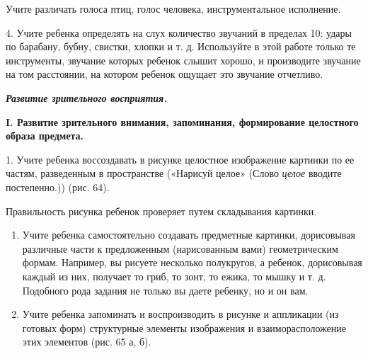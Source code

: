 \documentclass[a5paper]{book}
\renewcommand{\emph}[1]{\textit{#1}}
\begin{document}
Учите различать голоса птиц, голос человека, инструментальное
исполнение.

4. Учите ребенка определять на слух количество звучаний в пределах 10:
удары по барабану, бубну, свистки, хлопки и т. д. Используйте в этой
работе только те инструменты, звучание которых ребенок слышит хорошо, и
производите звучание на том расстоянии, на котором ребенок ощущает это
звучание отчетливо.

\emph{\textbf{Развитие зрительного восприятия.}}

\textbf{I. Развитие зрительного внимания, запоминания, формирование
целостного образа предмета.}

1. Учите ребенка воссоздавать в рисунке целостное изображение картинки
по ее частям, разведенным в пространстве («Нарисуй целое» (Слово
\emph{целое} вводите постепенно.)) (рис. 64).

Правильность рисунка ребенок проверяет путем складывания картинки.


\begin{enumerate}
\def\labelenumi{\arabic{enumi}.}
\setcounter{enumi}{1}
\item
  
  Учите ребенка самостоятельно создавать предметные картинки,
  дорисовывая различные части к предложенным (нарисованным вами)
  геометрическим формам. Например, вы рисуете несколько полукругов, а
  ребенок, дорисовывая каждый из них, получает то гриб, то зонт, то
  ежика, то мышку и т. д. Подобного рода задания не только вы даете
  ребенку, но и он вам.
  
\item
  
  Учите ребенка запоминать и воспроизводить в рисунке и аппликации (из
  готовых форм) структурные элементы изображения и взаиморасположение
  этих элементов (рис. 65 а, б).
  
\end{enumerate}
\end{document}
